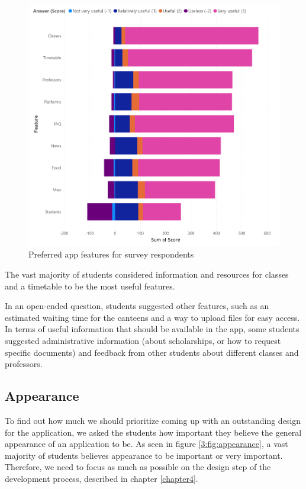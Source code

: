 \begin{figure}[ht]
    \centering
         \includegraphics[height=0.5\textheight]{figures/charts/survey/features.pdf}
    \caption{Preferred app features for survey respondents}
    \label{3:fig:features}
\end{figure}

The vast majority of students considered information and resources for classes and a timetable to be the most useful features.

In an open-ended question, students suggested other features, such as an estimated waiting time for the canteens and a way to upload files for easy access. In terms of useful information that should be available in the app, some students suggested administrative information (about scholarships, or how to request specific documents) and feedback from other students about different classes and professors.

\subsection{Appearance} \label{3:appearance}

To find out how much we should prioritize coming up with an outstanding design for the application, we asked the students how important they believe the general appearance of an application to be. As seen in figure \ref{3:fig:appearance}, a vast majority of students believes appearance to be important or very important. Therefore, we need to focus as much as possible on the design step of the development process, described in chapter \ref{chapter4}.

